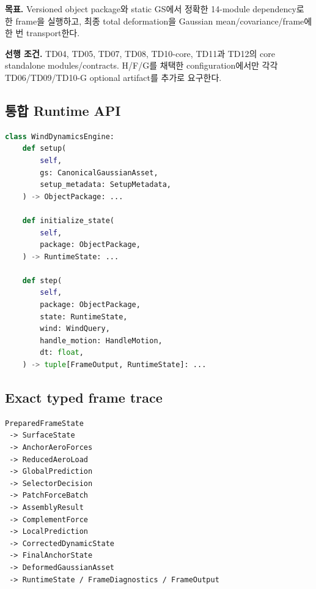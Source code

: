 \documentclass[10pt,a4paper]{article}
\begin{document}
\textbf{목표.}
Versioned object package와 static GS에서 정확한 14-module dependency로 한 frame을 실행하고,
최종 total deformation을 Gaussian mean/covariance/frame에 한 번 transport한다.

\textbf{선행 조건.}
TD04, TD05, TD07, TD08, TD10-core, TD11과 TD12의 core standalone modules/contracts.
H/F/G를 채택한 configuration에서만 각각 TD06/TD09/TD10-G optional artifact를 추가로 요구한다.

\subsection*{통합 Runtime API}

\begin{lstlisting}[language=Python]
class WindDynamicsEngine:
    def setup(
        self,
        gs: CanonicalGaussianAsset,
        setup_metadata: SetupMetadata,
    ) -> ObjectPackage: ...

    def initialize_state(
        self,
        package: ObjectPackage,
    ) -> RuntimeState: ...

    def step(
        self,
        package: ObjectPackage,
        state: RuntimeState,
        wind: WindQuery,
        handle_motion: HandleMotion,
        dt: float,
    ) -> tuple[FrameOutput, RuntimeState]: ...
\end{lstlisting}

\subsection*{Exact typed frame trace}

\begin{lstlisting}
PreparedFrameState
 -> SurfaceState
 -> AnchorAeroForces
 -> ReducedAeroLoad
 -> GlobalPrediction
 -> SelectorDecision
 -> PatchForceBatch
 -> AssemblyResult
 -> ComplementForce
 -> LocalPrediction
 -> CorrectedDynamicState
 -> FinalAnchorState
 -> DeformedGaussianAsset
 -> RuntimeState / FrameDiagnostics / FrameOutput
\end{lstlisting}
\end{document}
